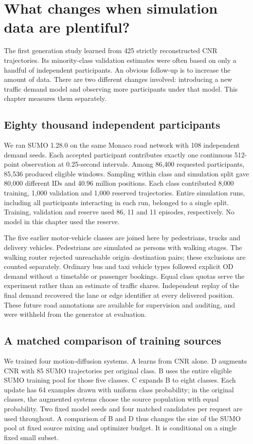 \chapter{What changes when simulation data are plentiful?}
\label{ch:expanded}
The first generation study learned from 425 strictly reconstructed CNR trajectories. Its minority-class validation estimates were often based on only a handful of independent participants. An obvious follow-up is to increase the amount of data. There are two different changes involved: introducing a new traffic demand model and observing more participants under that model. This chapter measures them separately.

\section{Eighty thousand independent participants}
We ran SUMO 1.28.0 on the same Monaco road network with 108 independent demand seeds. Each accepted participant contributes exactly one continuous 512-point observation at 0.25-second intervals. Among 86,400 requested participants, 85,536 produced eligible windows. Sampling within class and simulation split gave 80,000 different IDs and 40.96 million positions. Each class contributed 8,000 training, 1,000 validation and 1,000 reserved trajectories. Entire simulation runs, including all participants interacting in each run, belonged to a single split. Training, validation and reserve used 86, 11 and 11 episodes, respectively. No model in this chapter used the reserve.

The five earlier motor-vehicle classes are joined here by pedestrians, trucks and delivery vehicles. Pedestrians are simulated as persons with walking stages. The walking router rejected unreachable origin--destination pairs; these exclusions are counted separately. Ordinary bus and taxi vehicle types followed explicit OD demand without a timetable or passenger bookings. Equal class quotas serve the experiment rather than an estimate of traffic shares. Independent replay of the final demand recovered the lane or edge identifier at every delivered position. These future road annotations are available for supervision and auditing, and were withheld from the generator at evaluation.

\section{A matched comparison of training sources}
We trained four motion-diffusion systems. A learns from CNR alone. D augments CNR with 85 SUMO trajectories per original class. B uses the entire eligible SUMO training pool for those five classes. C expands B to eight classes. Each update has 64 examples drawn with uniform class probability; in the original classes, the augmented systems choose the source population with equal probability. Two fixed model seeds and four matched candidates per request are used throughout. A comparison of B and D thus changes the size of the SUMO pool at fixed source mixing and optimizer budget. It is conditional on a single fixed small subset.

